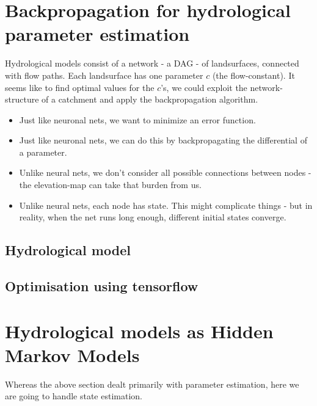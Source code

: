 \section{Backpropagation for hydrological parameter estimation}

Hydrological models consist of a network - a DAG - of landsurfaces, connected with flow paths. Each landsurface has one parameter $c$ (the flow-constant). 
It seems like to find optimal values for the $c$'s, we could exploit the network-structure of a catchment and apply the backpropagation algorithm.

\begin{itemize}
	\item Just like neuronal nets, we want to minimize an error function.
	\item Just like neuronal nets, we can do this by backpropagating the differential of a parameter. 
	\item Unlike neural nets, we don't consider all possible connections between nodes - the elevation-map can take that burden from us.
	\item Unlike neural nets, each node has state. This might complicate things - but in reality, when the net runs long enough, different initial states converge.
\end{itemize}


\subsection{Hydrological model}

\subsection{Optimisation using tensorflow}



\section{Hydrological models as Hidden Markov Models}
Whereas the above section dealt primarily with parameter estimation, here we are going to handle state estimation. 